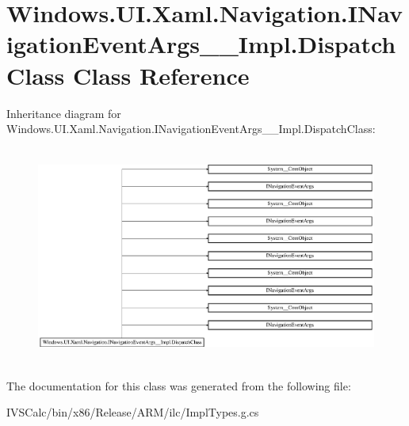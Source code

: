\hypertarget{class_windows_1_1_u_i_1_1_xaml_1_1_navigation_1_1_i_navigation_event_args_____impl_1_1_dispatch_class}{}\section{Windows.\+U\+I.\+Xaml.\+Navigation.\+I\+Navigation\+Event\+Args\+\_\+\+\_\+\+Impl.\+Dispatch\+Class Class Reference}
\label{class_windows_1_1_u_i_1_1_xaml_1_1_navigation_1_1_i_navigation_event_args_____impl_1_1_dispatch_class}
Inheritance diagram for Windows.\+U\+I.\+Xaml.\+Navigation.\+I\+Navigation\+Event\+Args\+\_\+\+\_\+\+Impl.\+Dispatch\+Class\+:\begin{figure}[H]
\begin{center}
\leavevmode
\includegraphics[height=7.213115cm]{class_windows_1_1_u_i_1_1_xaml_1_1_navigation_1_1_i_navigation_event_args_____impl_1_1_dispatch_class}
\end{center}
\end{figure}


The documentation for this class was generated from the following file\+:\begin{DoxyCompactItemize}
\item 
I\+V\+S\+Calc/bin/x86/\+Release/\+A\+R\+M/ilc/Impl\+Types.\+g.\+cs\end{DoxyCompactItemize}
